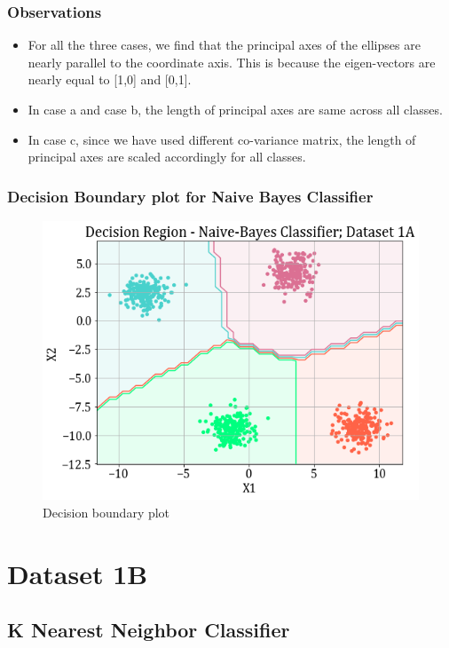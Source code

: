 \documentclass[11pt,a4paper]{article}
\newcommand{\noi}{\noindent}
\begin{document}
\subsubsection{Observations} 
\begin{itemize}
    \itemsep0em
    \item For all the three cases, we find that the principal axes of the ellipses are nearly parallel to the coordinate axis. This is because the eigen-vectors are nearly equal to [1,0] and [0,1].
    \item In case a and case b, the length of principal axes are same across all classes. 
    \item In case c, since we have used different co-variance matrix, the length of principal axes are scaled accordingly for all classes.
\end{itemize}

\subsubsection{Decision Boundary plot for Naive Bayes Classifier}
\begin{figure}[H]
    \centering
    \includegraphics[scale=0.6]{images/1A/1A_nb_case1_decisionregion.png}
    \caption{Decision boundary plot}
    \label{fig:db1}
\end{figure}

\noi

\break
\section{Dataset 1B}
\subsection{K Nearest Neighbor Classifier} 
\end{document}
